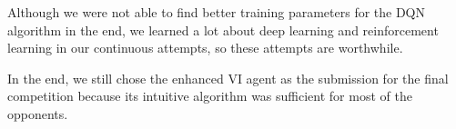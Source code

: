 \documentclass{article}
\begin{document}
Although we were not able to find better training parameters for the DQN algorithm in the end, we learned a lot about deep learning and reinforcement learning in our continuous attempts, so these attempts are worthwhile.

In the end, we still chose the enhanced VI agent as the submission for the final competition because its intuitive algorithm was sufficient for most of the opponents.












\end{document}
